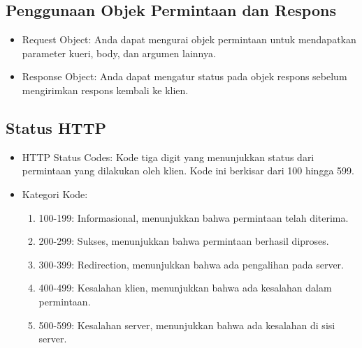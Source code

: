 \documentclass{article}
\begin{document}
\subsection{Penggunaan Objek Permintaan dan Respons}
\begin{itemize}
    \item Request Object: Anda dapat mengurai objek permintaan untuk mendapatkan parameter kueri, body, dan argumen lainnya.
    \item Response Object: Anda dapat mengatur status pada objek respons sebelum mengirimkan respons kembali ke klien.
\end{itemize}

\subsection{Status HTTP}
\begin{itemize}
    \item HTTP Status Codes: Kode tiga digit yang menunjukkan status dari permintaan yang dilakukan oleh klien. Kode ini berkisar dari 100 hingga 599.
    \item Kategori Kode:
          \begin{enumerate}
              \item 100-199: Informasional, menunjukkan bahwa permintaan telah diterima.
              \item 200-299: Sukses, menunjukkan bahwa permintaan berhasil diproses.
              \item 300-399: Redirection, menunjukkan bahwa ada pengalihan pada server.
              \item 400-499: Kesalahan klien, menunjukkan bahwa ada kesalahan dalam permintaan.
              \item 500-599: Kesalahan server, menunjukkan bahwa ada kesalahan di sisi server.
          \end{enumerate}
\end{itemize}
\end{document}
